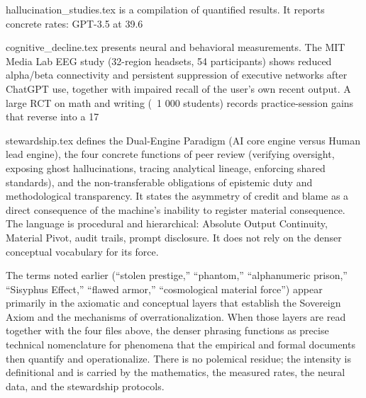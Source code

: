 hallucination_studies.tex is a compilation of quantified results. It reports concrete rates: GPT-3.5 at 39.6 %

cognitive_decline.tex presents neural and behavioral measurements. The MIT Media Lab EEG study (32-region headsets, 54 participants) shows reduced alpha/beta connectivity and persistent suppression of executive networks after ChatGPT use, together with impaired recall of the user’s own recent output. A large RCT on math and writing (~1 000 students) records practice-session gains that reverse into a 17 %

stewardship.tex defines the Dual-Engine Paradigm (AI core engine versus Human lead engine), the four concrete functions of peer review (verifying oversight, exposing ghost hallucinations, tracing analytical lineage, enforcing shared standards), and the non-transferable obligations of epistemic duty and methodological transparency. It states the asymmetry of credit and blame as a direct consequence of the machine’s inability to register material consequence. The language is procedural and hierarchical: Absolute Output Continuity, Material Pivot, audit trails, prompt disclosure. It does not rely on the denser conceptual vocabulary for its force.

The terms noted earlier (“stolen prestige,” “phantom,” “alphanumeric prison,” “Sisyphus Effect,” “flawed armor,” “cosmological material force”) appear primarily in the axiomatic and conceptual layers that establish the Sovereign Axiom and the mechanisms of overrationalization. When those layers are read together with the four files above, the denser phrasing functions as precise technical nomenclature for phenomena that the empirical and formal documents then quantify and operationalize. There is no polemical residue; the intensity is definitional and is carried by the mathematics, the measured rates, the neural data, and the stewardship protocols.

